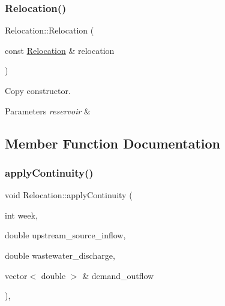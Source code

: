 \mbox{\label{classRelocation_a51eeb6a7d2b07940c2688b9b550145f0_a51eeb6a7d2b07940c2688b9b550145f0}} 
\subsubsection{\texorpdfstring{Relocation()}{Relocation()}\hspace{0.1cm}{\footnotesize\ttfamily [2/2]}}
{\footnotesize\ttfamily Relocation\+::\+Relocation (\begin{DoxyParamCaption}\item[{const \mbox{\hyperlink{classRelocation}{Relocation}} \&}]{relocation }\end{DoxyParamCaption})}

Copy constructor. 
\begin{DoxyParams}{Parameters}
{\em reservoir} & \\
\hline
\end{DoxyParams}


\subsection{Member Function Documentation}
\mbox{\label{classRelocation_af5c795c7b331b86b31c8bfa2ef9b6fe5_af5c795c7b331b86b31c8bfa2ef9b6fe5}} 
\subsubsection{\texorpdfstring{apply\+Continuity()}{applyContinuity()}}
{\footnotesize\ttfamily void Relocation\+::apply\+Continuity (\begin{DoxyParamCaption}\item[{int}]{week,  }\item[{double}]{upstream\+\_\+source\+\_\+inflow,  }\item[{double}]{wastewater\+\_\+discharge,  }\item[{vector$<$ double $>$ \&}]{demand\+\_\+outflow }\end{DoxyParamCaption})\hspace{0.3cm}{\ttfamily [override]}, {\ttfamily [virtual]}}



